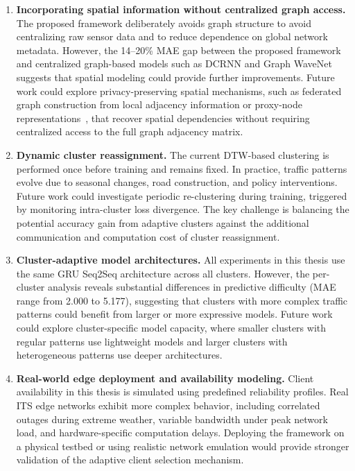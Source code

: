 \begin{enumerate}
    \item \textbf{Incorporating spatial information without centralized graph access.} The proposed framework deliberately avoids graph structure to avoid centralizing raw sensor data and to reduce dependence on global network metadata. However, the 14--20\% MAE gap between the proposed framework and centralized graph-based models such as DCRNN and Graph WaveNet suggests that spatial modeling could provide further improvements. Future work could explore privacy-preserving spatial mechanisms, such as federated graph construction from local adjacency information or proxy-node representations~\cite{zhou2026fedhint}, that recover spatial dependencies without requiring centralized access to the full graph adjacency matrix.

    \item \textbf{Dynamic cluster reassignment.} The current DTW-based clustering is performed once before training and remains fixed. In practice, traffic patterns evolve due to seasonal changes, road construction, and policy interventions. Future work could investigate periodic re-clustering during training, triggered by monitoring intra-cluster loss divergence. The key challenge is balancing the potential accuracy gain from adaptive clusters against the additional communication and computation cost of cluster reassignment.

    \item \textbf{Cluster-adaptive model architectures.} All experiments in this thesis use the same GRU Seq2Seq architecture across all clusters. However, the per-cluster analysis reveals substantial differences in predictive difficulty (MAE range from 2.000 to 5.177), suggesting that clusters with more complex traffic patterns could benefit from larger or more expressive models. Future work could explore cluster-specific model capacity, where smaller clusters with regular patterns use lightweight models and larger clusters with heterogeneous patterns use deeper architectures.

    \item \textbf{Real-world edge deployment and availability modeling.} Client availability in this thesis is simulated using predefined reliability profiles. Real ITS edge networks exhibit more complex behavior, including correlated outages during extreme weather, variable bandwidth under peak network load, and hardware-specific computation delays. Deploying the framework on a physical testbed or using realistic network emulation would provide stronger validation of the adaptive client selection mechanism.


\end{enumerate}
